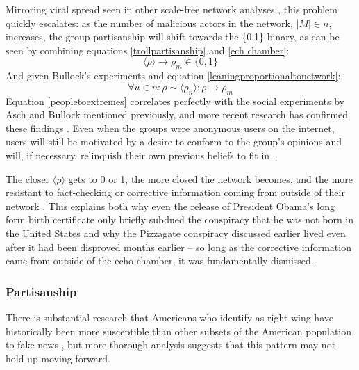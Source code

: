 \documentclass[preprint,review,12pt]{elsarticle}
\begin{document}
Mirroring viral spread seen in other scale-free network analyses \cite{pastor2001epidemic,cohen2003efficient}, this problem quickly escalates: as the number of malicious actors in the network, $|M| \in n$, increases, the group partisanship will shift towards the \{0,1\} binary, as can be seen by combining equations \ref{trollpartisanship} and \ref{ech chamber}: 
\begin{equation}
\langle \rho \rangle \rightarrow \rho_m \in \{0,1\}
\end{equation} 
And given Bullock's experiments and equation \ref{leaningproportionaltonetwork}:
\begin{equation}
\label{peopletoextremes}
    \forall u \in n: \rho \sim \langle \rho_n \rangle: \rho \rightarrow \rho_m
\end{equation}
Equation \ref{peopletoextremes} correlates perfectly with the social experiments by Asch and Bullock mentioned previously, and more recent research has confirmed these findings \cite{colliander2019fake,edelson2011following}. Even when the groups were anonymous users on the internet, users will still be motivated by a desire to conform to the group's opinions and will, if necessary, relinquish their own previous beliefs to fit in \cite{williams2000cyberostracism,zhu2012switch,tsikerdekis2013effects,breitsohl2015groupthink,winter2015they,hamilton2017s}. 

The closer $\langle \rho \rangle$ gets to 0 or 1, the more closed the network becomes, and the more resistant to fact-checking or corrective information coming from outside of their network \cite{garrett2013undermining,lord1979biased,edwards1996disconfirmation,redlawsk2002hot, taber2006motivated}. This explains both why even the release of President Obama's long form birth certificate only briefly subdued the conspiracy that he was not born in the United States \cite{nyhan2012new} and why the Pizzagate conspiracy discussed earlier lived even after it had been disproved months earlier -- so long as the corrective information came from outside of the echo-chamber, it was fundamentally dismissed.


\subsubsection{Partisanship} 
\label{Partisanship Section}
There is substantial research that Americans who identify as right-wing have historically been more susceptible than other subsets of the American population to fake news \cite{guess2019less,benkler2018network,grinberg2019fake,allcott2017social,badawy2018analyzing}, but more thorough analysis suggests that this pattern may not hold up moving forward.
\end{document}
